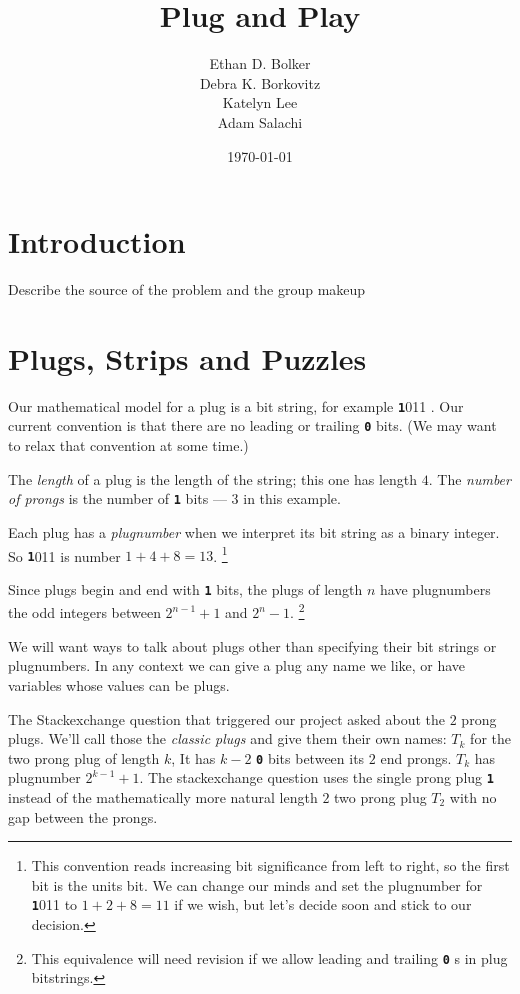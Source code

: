 \documentclass[10pt]{article}
\title{Plug and Play}
\author{
Ethan D. Bolker \\
Debra K. Borkovitz\\
  Katelyn Lee\\
  Adam Salachi
}
\date{\today}
\numberwithin{equation}{section}
\newenvironment{anote}
               {{\textcolor{blue}{Note:}}
                 \itshape
               }
               {}
\newcommand{\plug}[1]{%
\mbox{{\textbf\texttt #1}}
}
\begin{document}
\maketitle

\section{Introduction}

\begin{anote}
Describe the source of the problem and the group makeup
\end{anote}



\section{Plugs, Strips and Puzzles}

Our mathematical model for a plug is a bit string, for example
\plug{1011}. Our current convention is that there are no leading or
trailing \plug{0} bits. (We may want to relax that convention at some
time.)

The \emph{length} of a plug is the length of the string; this one has
length $4$. The \emph{number of prongs} is the number of \plug{1} bits
--- $3$ in this example.

Each plug has a \emph{plugnumber} when we
interpret its bit string as a binary integer. So \plug{1011} is
number $1 + 4 + 8 = 13$.%
\footnote{This convention reads increasing bit significance from left
  to right, so the first bit is the units bit. We can change our minds
  and set the plugnumber for \plug{1011} to $1+2+8 = 11$ if we wish,
  but let's decide soon and stick to our decision.}

Since plugs begin and end with \plug{1} bits,
the plugs of length $n$ have plugnumbers the odd integers between
$2^{n-1} +1$ and $2^n -1$.
\footnote{This equivalence will need revision if we allow leading and
  trailing \plug{0}s in plug bitstrings.}

We will want ways to talk about plugs other than specifying their bit
strings or plugnumbers. In any context we can give a plug any name we
like, or have variables whose values can be plugs.

The Stackexchange question that triggered our project asked about
the $2$ prong plugs. We'll call those the \emph{classic plugs} and give
them their own names: $T_k$ for the two prong plug of length $k$, It
has $k-2$ \plug{0} bits between its $2$ end prongs. $T_k$ has plugnumber $2^{k-1} + 1$.
 The stackexchange question uses the single prong plug \plug{1}{} instead of the mathematically more natural length $2$ two prong plug $T_2$ with no gap between the prongs.
 
\end{document}
